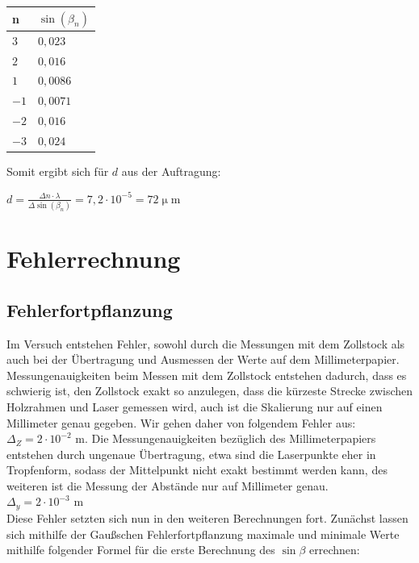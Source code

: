 \documentclass[12pt,a4paper,titlepage,headinclude,bibtotoc]{scrartcl}
\begin{document}
\begin{table} [h!]
\centering
\begin{tabular}{|p{4 cm}||p{4 cm}|}
        \hline
		n & $\sin(\beta_n)$ \\
         \hline 
         $3$ & $0,023$  \\
         \hline
         $2$ & $0,016$ \\
         \hline
         $1$ & $0,0086$\\
         \hline
         $-1$ & $0,0071$\\
         \hline
         $-2$ & $0,016$  \\
         \hline             
         $-3$ & $0,024$   \\
         \hline
\end{tabular}
\end{table}



Somit ergibt sich für $d$ aus der Auftragung:

$ d= \frac{\Delta n \cdot \lambda}{\Delta \sin(\beta_n)} = 7,2\cdot 10^{-5} = 72\upmu $m





\section{Fehlerrechnung}
\subsection{Fehlerfortpflanzung}
Im Versuch entstehen Fehler, sowohl durch die Messungen mit dem Zollstock als auch bei der Übertragung und Ausmessen der Werte auf dem Millimeterpapier. Messungenauigkeiten beim Messen mit dem Zollstock entstehen dadurch, dass es schwierig ist, den Zollstock exakt so anzulegen, dass die kürzeste Strecke zwischen Holzrahmen und Laser gemessen wird, auch ist die Skalierung nur auf einen Millimeter genau gegeben. Wir gehen daher von folgendem Fehler aus: $\Delta_{Z}={2} \cdot{10^{-2}}$ m. Die Messungenauigkeiten bezüglich des Millimeterpapiers entstehen durch ungenaue Übertragung, etwa sind die Laserpunkte eher in Tropfenform, sodass der Mittelpunkt nicht exakt bestimmt werden kann, des weiteren ist die Messung der Abstände nur auf Millimeter genau.\\ $\Delta_{y}={2} \cdot {10^{-3}}$ m \\

Diese Fehler setzten sich nun in den weiteren Berechnungen fort. Zunächst lassen sich mithilfe der Gaußschen Fehlerfortpflanzung maximale und minimale Werte mithilfe folgender Formel für die erste Berechnung des $\sin \beta$ errechnen:\\
\end{document}
